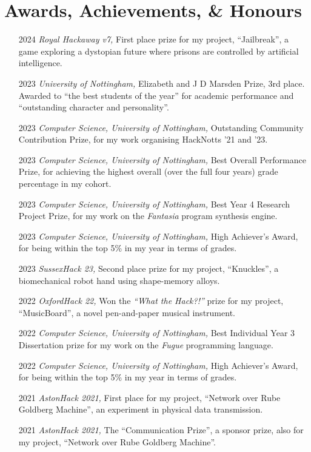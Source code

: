 \documentclass[12pt]{article}
\begin{document}
\section*{Awards, Achievements, \& Honours}
\begin{itemize}
	\item[2024] \textit{Royal Hackaway v7,} First place prize for my project, ``Jailbreak'', a game exploring a dystopian future where prisons are controlled by artificial intelligence.
	\item[2023] \textit{University of Nottingham,} Elizabeth and J D Marsden Prize, 3rd place. Awarded to ``the best students of the year'' for academic performance and ``outstanding character and personality''.
	\item[2023] \textit{Computer Science, University of Nottingham,} Outstanding Community Contribution Prize, for my work organising HackNotts '21 and '23.
	\item[2023] \textit{Computer Science, University of Nottingham,} Best Overall Performance Prize, for achieving the highest overall (over the full four years) grade percentage in my cohort.
	\item[2023] \textit{Computer Science, University of Nottingham,} Best Year 4 Research Project Prize, for my work on the \textit{Fantasia} program synthesis engine.
	\item[2023] \textit{Computer Science, University of Nottingham,} High Achiever's Award, for being within the top 5\% in my year in terms of grades.
	\item[2023] \textit{SussexHack 23,} Second place prize for my project, ``Knuckles'', a biomechanical robot hand using shape-memory alloys.
	\item[2022] \textit{OxfordHack 22,} Won the \textit{``What the Hack?!''} prize for my project, ``MusicBoard'', a novel pen-and-paper musical instrument.
	\item[2022] \textit{Computer Science, University of Nottingham,} Best Individual Year 3 Dissertation prize for my work on the \textit{Fugue} programming language.
	\item[2022] \textit{Computer Science, University of Nottingham,} High Achiever's Award, for being within the top 5\% in my year in terms of grades.
	\item[2021] \textit{AstonHack 2021,} First place for my project, ``Network over Rube Goldberg Machine'', an experiment in physical data transmission.
	\item[2021] \textit{AstonHack 2021,} The ``Communication Prize'', a sponsor prize, also for my project, ``Network over Rube Goldberg Machine''.

\end{itemize}
\end{document}
